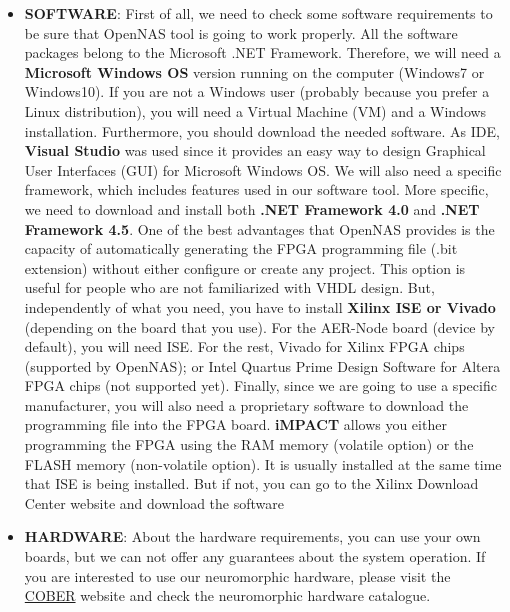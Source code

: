 \begin{itemize}
    \item \textbf{SOFTWARE}: First of all, we need to check some software requirements to be sure that OpenNAS tool is going to work properly. All the software packages belong to the Microsoft .NET Framework. Therefore, we will need a \textbf{Microsoft Windows OS} version running on the computer (Windows7 or Windows10). If you are not a Windows user (probably because you prefer a Linux distribution), you will need a Virtual Machine (VM) and a Windows installation. Furthermore, you should download the needed software. As IDE, \textbf{Visual Studio} was used since it provides an easy way to design Graphical User Interfaces (GUI) for Microsoft Windows OS. We will also need a specific framework, which includes features used in our software tool. More specific, we need to download and install both \textbf{.NET Framework 4.0} and \textbf{.NET Framework 4.5}. One of the best advantages that OpenNAS provides is the capacity of automatically generating the FPGA programming file (.bit extension) without either configure or create any project. This option is useful for people who are not familiarized with VHDL design. But, independently of what you need, you have to install \textbf{Xilinx ISE or Vivado} (depending on the board that you use). For the AER-Node board (device by default), you will need ISE. For the rest, Vivado for Xilinx FPGA chips (supported by OpenNAS); or Intel Quartus Prime Design Software for Altera FPGA chips (not supported yet). Finally, since we are going to use a specific manufacturer, you will also need a proprietary software to download the programming file into the FPGA board. \textbf{iMPACT} allows you either programming the FPGA using the RAM memory (volatile option) or the FLASH memory (non-volatile option). It is usually installed at the same time that ISE is being installed. But if not, you can go to the Xilinx Download Center website and download the software
    
    \item \textbf{HARDWARE}: About the hardware requirements, you can use your own boards, but we can not offer any guarantees about the system operation. If you are interested to use our neuromorphic hardware, please visit the \textcolor{blue}{\href{https://www.t-cober.es}{COBER}} website and check the neuromorphic hardware catalogue.
    
\end{itemize}




